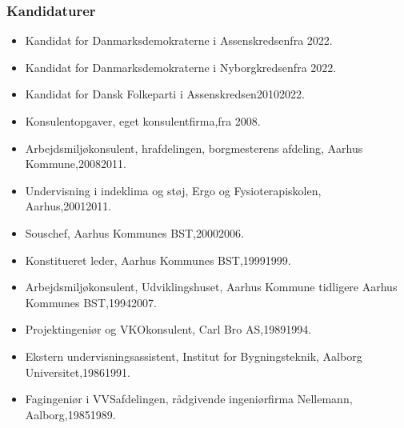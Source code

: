 \documentclass[11pt, a4paper]{awesome-cv}
\begin{document}
\begin{cvletter}
\subsubsection*{Kandidaturer}
\begin{itemize}
\item Kandidat for Danmarksdemokraterne i Assenskredsenfra 2022.
\item Kandidat for Danmarksdemokraterne i Nyborgkredsenfra 2022.
\item Kandidat for Dansk Folkeparti i Assenskredsen20102022.
\end{itemize}
\begin{itemize}
\item Konsulentopgaver, eget konsulentfirma,fra 2008.
\item Arbejdsmiljøkonsulent, hrafdelingen, borgmesterens afdeling, Aarhus Kommune,20082011.
\item Undervisning i indeklima og støj, Ergo og Fysioterapiskolen, Aarhus,20012011.
\item Souschef, Aarhus Kommunes BST,20002006.
\item Konstitueret leder, Aarhus Kommunes BST,19991999.
\item Arbejdsmiljøkonsulent, Udviklingshuset, Aarhus Kommune tidligere Aarhus Kommunes BST,19942007.
\item Projektingeniør og VKOkonsulent, Carl Bro AS,19891994.
\item Ekstern undervisningsassistent, Institut for Bygningsteknik, Aalborg Universitet,19861991.
\item Fagingeniør i VVSafdelingen, rådgivende ingeniørfirma Nellemann, Aalborg,19851989.
\end{itemize}
\end{cvletter}
\end{document}
